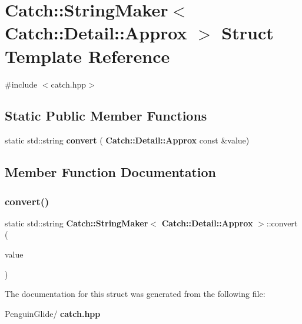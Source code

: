 \section{Catch\+::String\+Maker$<$ Catch\+::Detail\+::Approx $>$ Struct Template Reference}
\label{struct_catch_1_1_string_maker_3_01_catch_1_1_detail_1_1_approx_01_4}


{\ttfamily \#include $<$catch.\+hpp$>$}

\subsection*{Static Public Member Functions}
\begin{DoxyCompactItemize}
\item 
static std\+::string \textbf{ convert} (\textbf{ Catch\+::\+Detail\+::\+Approx} const \&value)
\end{DoxyCompactItemize}


\subsection{Member Function Documentation}
\mbox{\label{struct_catch_1_1_string_maker_3_01_catch_1_1_detail_1_1_approx_01_4_a8e5015720682fecfbff0f05de19a698f}} 
\subsubsection{convert()}
{\footnotesize\ttfamily static std\+::string \textbf{ Catch\+::\+String\+Maker}$<$ \textbf{ Catch\+::\+Detail\+::\+Approx} $>$\+::convert (\begin{DoxyParamCaption}\item[{\textbf{ Catch\+::\+Detail\+::\+Approx} const \&}]{value }\end{DoxyParamCaption})\hspace{0.3cm}{\ttfamily [static]}}



The documentation for this struct was generated from the following file\+:\begin{DoxyCompactItemize}
\item 
Penguin\+Glide/\textbf{ catch.\+hpp}\end{DoxyCompactItemize}
